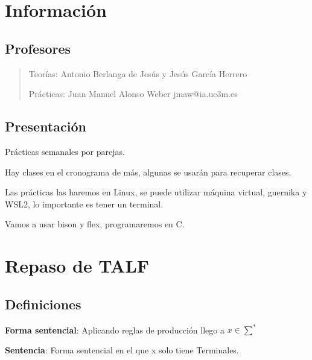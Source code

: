 \documentclass[12pt, twoside, openright]{report} %
\begin{document}
\listoffigures
\thispagestyle{fancy}

\listoftables
\thispagestyle{fancy}

\clearpage
{} %



\chapter{Información}
\section{Profesores}

\begin{quote}
	Teorías: Antonio Berlanga de Jesús y Jesús García Herrero

	Prácticas: Juan Manuel Alonso Weber jmaw@ia.uc3m.es
\end{quote}

\section{Presentación}

Prácticas semanales por parejas.

Hay clases en el cronograma de más, algunas se usarán para recuperar clases.

Las prácticas las haremos en Linux, se puede utilizar máquina virtual, guernika y WSL2, lo importante es tener un terminal.

Vamos a usar bison y flex, programaremos en C.

\chapter{Repaso de TALF}

\section{Definiciones}

\textbf{Forma sentencial}: Aplicando reglas de producción llego a \(x \in \sum^*\)

\textbf{Sentencia}: Forma sentencial en el que x solo tiene Terminales.
\end{document}
